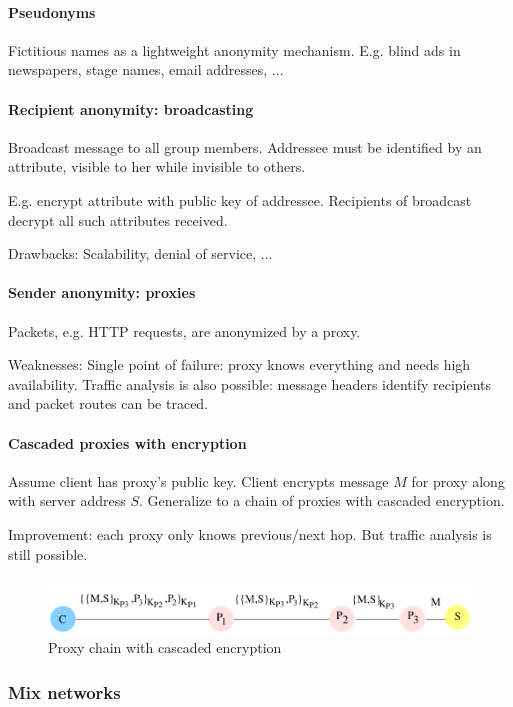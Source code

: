 \paragraph{Pseudonyms} Fictitious names as a lightweight anonymity mechanism. E.g. blind ads in newspapers, stage names, email addresses, ...

\paragraph{Recipient anonymity: broadcasting} Broadcast message to all group members. Addressee must be identified by an attribute, visible to her while invisible to others. 

E.g. encrypt attribute with public key of addressee. Recipients of broadcast decrypt all such attributes received.

Drawbacks: Scalability, denial of service, ...

\paragraph{Sender anonymity: proxies} Packets, e.g. HTTP requests, are anonymized by a proxy.

Weaknesses: Single point of failure: proxy knows everything and needs high availability. Traffic analysis is also possible: message headers identify recipients and packet routes can be traced.

\paragraph{Cascaded proxies with encryption} Assume client has proxy’s public key. Client encrypts message $M$ for proxy along with server address $S$. 
Generalize to a chain of proxies with cascaded encryption.

Improvement: each proxy only knows previous/next hop. But traffic analysis is still possible.

\begin{figure}[h]
    \centering
    \includegraphics[width=13cm]{images/ch12-an-cascading-proxy.png}
    \caption{Proxy chain with cascaded encryption}
    \label{fig:an-cascading-encryption}
\end{figure}


\subsubsection{Mix networks} %

